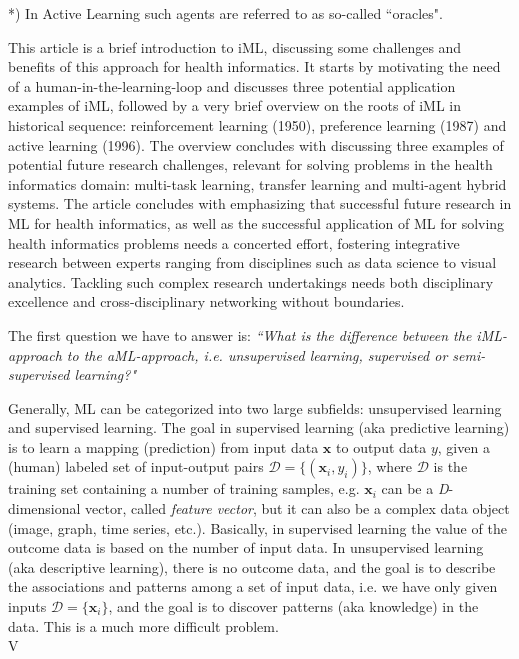 *) In Active Learning such agents are referred to as so-called ``oracles".

This article is a brief introduction to iML, discussing some challenges and benefits of this approach for health informatics. It starts by motivating the need of a human-in-the-learning-loop and discusses three potential application examples of iML, followed by a very brief overview on the roots of iML in historical sequence: reinforcement learning (1950), preference learning (1987) and active learning (1996). The overview concludes with discussing three examples of potential future research challenges, relevant for solving problems in the health informatics domain: multi-task learning, transfer learning and multi-agent hybrid systems. The article concludes with emphasizing that successful future research in ML for health informatics, as well as the successful application of ML for solving health informatics problems needs a concerted effort, fostering integrative research between experts ranging from disciplines such as data science to visual analytics. Tackling such complex research undertakings needs both disciplinary excellence and cross-disciplinary networking without boundaries.

The first question we have to answer is: \textit{``What is the difference between the iML-approach to the aML-approach, i.e. unsupervised learning, supervised or semi-supervised learning?"}

Generally, ML can be categorized into two large subfields: unsupervised learning and supervised learning. The goal in supervised learning (aka predictive learning) is to learn a mapping (prediction) from input data $\textbf{x}$ to output data $y$, given a (human) labeled set of input-output pairs $\mathcal{D}=\{(\textbf{x}_{i},y_i)\}$, where $\mathcal{D}$ is the training set containing a number of training samples, e.g. $\textbf{x}_{i}$ can be a \textit{D}-dimensional vector, called \textit{feature vector}, but it can also be a complex data object (image, graph, time series, etc.). Basically, in supervised learning the value of the outcome data is based on the number of input data.
In unsupervised learning (aka descriptive learning), there is no outcome data, and the goal is to describe the associations and patterns among a set of input data, i.e. we have only given inputs $\mathcal{D}=\{\textbf{x}_{i}\}$, and the goal is to discover patterns (aka knowledge) in the data. This is a much more difficult problem.\\



V


